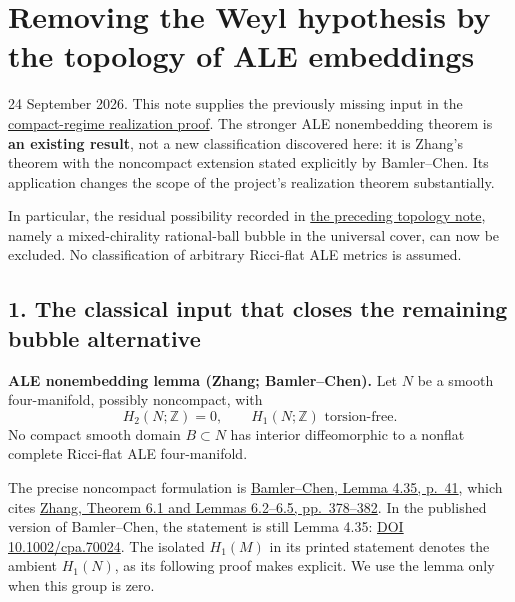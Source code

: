 \documentclass[
  11pt,
]{article}
\author{}
\date{}
\begin{document}
\hypertarget{removing-the-weyl-hypothesis-by-the-topology-of-ale-embeddings}{%
\section{Removing the Weyl hypothesis by the topology of ALE
embeddings}\label{removing-the-weyl-hypothesis-by-the-topology-of-ale-embeddings}}

24 September 2026. This note supplies the previously missing input in
the \href{20260923_compact_realization.md}{compact-regime realization
proof}. The stronger ALE nonembedding theorem is \textbf{an existing
result}, not a new classification discovered here: it is Zhang's theorem
with the noncompact extension stated explicitly by Bamler--Chen. Its
application changes the scope of the project's realization theorem
substantially.

In particular, the residual possibility recorded in
\href{20260923_topological_core_scope.md}{the preceding topology note},
namely a mixed-chirality rational-ball bubble in the universal cover,
can now be excluded. No classification of arbitrary Ricci-flat ALE
metrics is assumed.

\hypertarget{the-classical-input-that-closes-the-remaining-bubble-alternative}{%
\subsection{1. The classical input that closes the remaining bubble
alternative}\label{the-classical-input-that-closes-the-remaining-bubble-alternative}}

\textbf{ALE nonembedding lemma (Zhang; Bamler--Chen).} Let \(N\) be a
smooth four-manifold, possibly noncompact, with \[
 H_2(N;\mathbb Z)=0,\qquad H_1(N;\mathbb Z)\text{ torsion-free}.
 \tag{1}
\] No compact smooth domain \(B\subset N\) has interior diffeomorphic to
a nonflat complete Ricci-flat ALE four-manifold.

The precise noncompact formulation is
\href{https://arxiv.org/pdf/2305.03154}{Bamler--Chen, Lemma 4.35,
p.~41}, which cites
\href{https://msp.org/pjm/2019/303-1/pjm-v303-n1-p14-s.pdf}{Zhang,
Theorem 6.1 and Lemmas 6.2--6.5, pp.~378--382}. In the published version
of Bamler--Chen, the statement is still Lemma 4.35:
\href{https://doi.org/10.1002/cpa.70024}{DOI 10.1002/cpa.70024}. The
isolated \(H_1(M)\) in its printed statement denotes the ambient
\(H_1(N)\), as its following proof makes explicit. We use the lemma only
when this group is zero.
\end{document}
